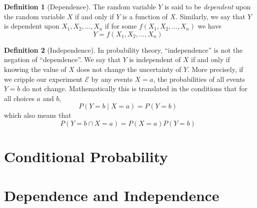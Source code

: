 \documentclass[11pt]{article}
\theoremstyle{definition}\newtheorem{definition}{Definition}
\theoremstyle{definition}\newtheorem{question}{Question}
\theoremstyle{definition}\newtheorem*{solution}{Solution}
\theoremstyle{definition}\newtheorem{example}{Example}
\theoremstyle{definition}\newtheorem{notation}{Notation}
\theoremstyle{theorem}\newtheorem{theorem}{Theorem}
\theoremstyle{theorem}\newtheorem{corollary}{Corollary}
\theoremstyle{theorem}\newtheorem{lemma}{Lemma}
\theoremstyle{theorem}\newtheorem{proposition}{Proposition}
\newcommand{\E}{\mathcal{E}}
\begin{document}
\begin{definition}[Dependence]
    The random variable $Y$ is said to be \emph{dependent} upon the random variable $X$ if and only if $Y$ is a function of $X$. Similarly, we say that $Y$ is dependent upon $X_1, X_2,..., X_n$ if for some $f(X_1, X_2,..., X_n)$ we have
    \begin{equation*}
        Y = f(X_1, X_2,..., X_n)
    \end{equation*}
\end{definition}

\begin{definition}[Independence]
    In probability theory, ``independence'' is not the negation of ``dependence''. We say that $Y$ is independent of $X$ if and only if knowing the value of $X$ does not change the uncertainty of $Y$. More precisely, if we cripple our experiment $\E$ by any events $X = a$, the probabilities of all events $Y = b$ do not change. Mathematically this is translated in the conditions that for all choices $a$ and $b$,
    \begin{equation*}
        P(Y = b \mid X = a) = P(Y = b)
    \end{equation*}
    which also means that
    \begin{equation*}
        P(Y = b \cap X = a) = P(X = a) P(Y = b)
    \end{equation*}
\end{definition}

\section{Conditional Probability}

\section{Dependence and Independence}
\end{document}
